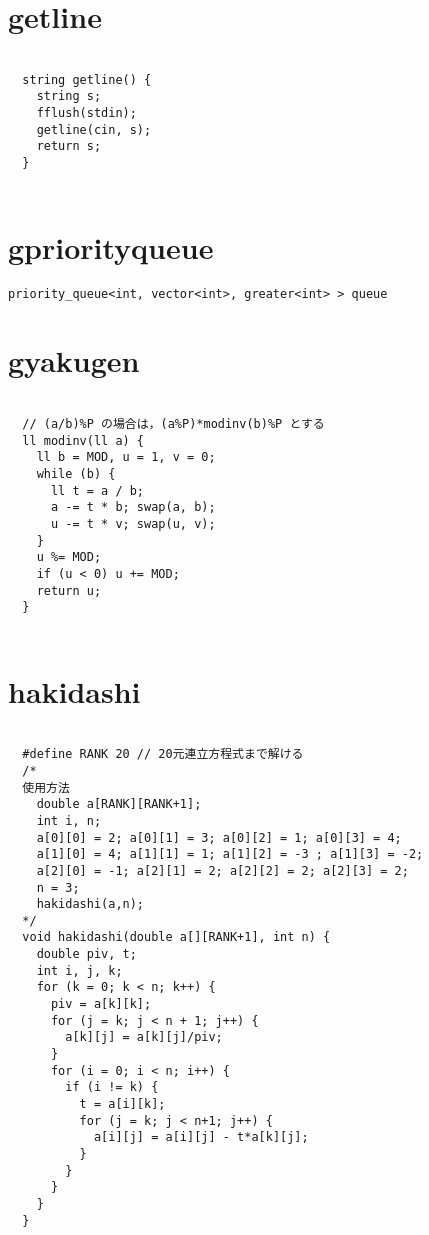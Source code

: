 \documentclass{jsarticle}
\begin{document}
\color{white}
\section{getline}
\color{black}
\begin{lstlisting}[caption=getline]

  string getline() {
    string s;
    fflush(stdin);
    getline(cin, s);
    return s;
  }
  

\end{lstlisting}

\color{white}
\section{gpriorityqueue}
\color{black}
\begin{lstlisting}[caption=gpriorityqueue]
priority_queue<int, vector<int>, greater<int> > queue

\end{lstlisting}

\color{white}
\section{gyakugen}
\color{black}
\begin{lstlisting}[caption=gyakugen]

  // (a/b)%P の場合は，(a%P)*modinv(b)%P とする
  ll modinv(ll a) {
    ll b = MOD, u = 1, v = 0;
    while (b) {
      ll t = a / b;
      a -= t * b; swap(a, b);
      u -= t * v; swap(u, v);
    }
    u %= MOD;
    if (u < 0) u += MOD;
    return u;
  }
  

\end{lstlisting}

\color{white}
\section{hakidashi}
\color{black}
\begin{lstlisting}[caption=hakidashi]

  #define RANK 20 // 20元連立方程式まで解ける
  /*
  使用方法
    double a[RANK][RANK+1];
    int i, n;
    a[0][0] = 2; a[0][1] = 3; a[0][2] = 1; a[0][3] = 4;
    a[1][0] = 4; a[1][1] = 1; a[1][2] = -3 ; a[1][3] = -2;
    a[2][0] = -1; a[2][1] = 2; a[2][2] = 2; a[2][3] = 2;
    n = 3;
    hakidashi(a,n);
  */
  void hakidashi(double a[][RANK+1], int n) { 
    double piv, t;
    int i, j, k;
    for (k = 0; k < n; k++) {
      piv = a[k][k];
      for (j = k; j < n + 1; j++) {
        a[k][j] = a[k][j]/piv;
      }
      for (i = 0; i < n; i++) {
        if (i != k) {
          t = a[i][k];
          for (j = k; j < n+1; j++) {
            a[i][j] = a[i][j] - t*a[k][j];
          }
        }
      }
    }
  }
  

\end{lstlisting}
\end{document}
